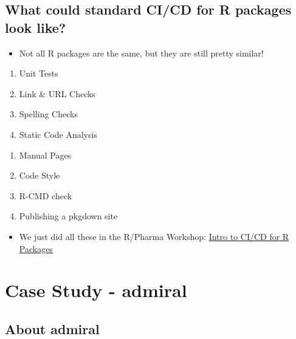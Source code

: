 \documentclass[
  letterpaper,
  DIV=11,
  numbers=noendperiod]{scrartcl}
\providecommand{\tightlist}{%
  \setlength{\itemsep}{0pt}\setlength{\parskip}{0pt}}\usepackage{longtable,booktabs,array}
\begin{document}
\hypertarget{what-could-standard-cicd-for-r-packages-look-like}{%
\subsection{What could standard CI/CD for R packages look
like?}\label{what-could-standard-cicd-for-r-packages-look-like}}

\begin{itemize}
\tightlist
\item
  Not all R packages are the same, but they are still pretty similar!
\end{itemize}

\begin{enumerate}
\def\labelenumi{\arabic{enumi}.}
\tightlist
\item
  Unit Tests
\item
  Link \& URL Checks
\item
  Spelling Checks
\item
  Static Code Analysis
\end{enumerate}

\begin{enumerate}
\def\labelenumi{\arabic{enumi}.}
\setcounter{enumi}{4}
\tightlist
\item
  Manual Pages
\item
  Code Style
\item
  R-CMD check
\item
  Publishing a pkgdown site
\end{enumerate}

\begin{itemize}
\tightlist
\item
  We just did all these in the R/Pharma Workshop:
  \href{https://pharmaverse.github.io/cicdworkshop.rinpharma2022/workshop/index.html\#/title-slide}{Intro
  to CI/CD for R Packages}
\end{itemize}

\hypertarget{case-study---admiral}{%
\section{Case Study - admiral}\label{case-study---admiral}}

\hypertarget{about-admiral}{%
\subsection{About admiral}\label{about-admiral}}
\end{document}
